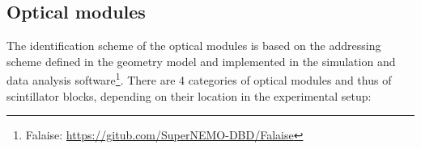 \documentclass[12pt,a4paper]{article}
\begin{document}

\subsection{Optical modules}

The  identification scheme  of the  optical  modules is  based on  the
addressing scheme defined in the geometry model and implemented in the
simulation     and     data    analysis     software\footnote{Falaise:
  \url{https://gitub.com/SuperNEMO-DBD/Falaise}}.     There   are    4
categories  of  optical  modules  and  thus  of  scintillator  blocks,
depending on their location in the experimental setup:
\end{document}
